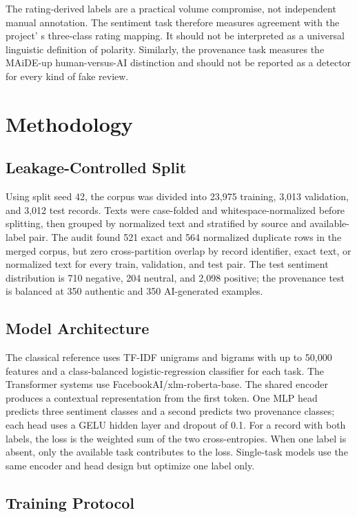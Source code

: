 \documentclass[11pt,a4paper]{article}
\begin{document}
The rating-derived labels are a practical volume compromise, not
independent manual annotation. The sentiment task therefore measures
agreement with the project' s three-class rating mapping.
It should not be interpreted as a universal linguistic definition of
polarity. Similarly, the provenance task measures the MAiDE-up
human-versus-AI distinction and should not be reported as a detector for
every kind of fake review.

\section{Methodology}

\subsection{Leakage-Controlled Split}

Using split seed 42, the corpus was divided into 23,975 training, 3,013
validation, and 3,012 test records. Texts were case-folded and
whitespace-normalized before splitting, then grouped by normalized text
and stratified by source and available-label pair. The audit found 521
exact and 564 normalized duplicate rows in the merged corpus, but zero
cross-partition overlap by record identifier, exact text, or normalized
text for every train, validation, and test pair. The test sentiment
distribution is 710 negative, 204 neutral, and 2,098 positive; the
provenance test is balanced at 350 authentic and 350 AI-generated
examples.

\subsection{Model Architecture}

The classical reference uses TF-IDF unigrams and bigrams with up to
50,000 features and a class-balanced logistic-regression classifier for
each task. The Transformer systems use FacebookAI/xlm-roberta-base. The
shared encoder produces a contextual representation from the first
token. One MLP head predicts three sentiment classes and a second
predicts two provenance classes; each head uses a GELU hidden layer and
dropout of 0.1. For a record with both labels, the loss is the weighted
sum of the two cross-entropies. When one label is absent, only the
available task contributes to the loss. Single-task models use the same
encoder and head design but optimize one label only.

\subsection{Training Protocol}
\end{document}
